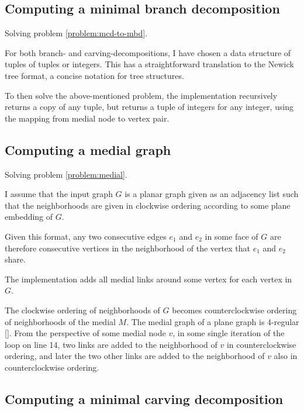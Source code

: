 \documentclass{article}
\begin{document}

	\subsection{Computing a minimal branch decomposition}\label{impl:mcd-to-mbd}
		
		Solving problem \ref{problem:mcd-to-mbd}.

		For both branch- and carving-decompositions, I have chosen a data structure of tuples of tuples or integers. This has a straightforward translation to the Newick tree format, a concise notation for tree structures.

		To then solve the above-mentioned problem, the implementation recursively returns a copy of any tuple, but returns a tuple of integers for any integer, using the mapping from medial node to vertex pair.

		
	\subsection{Computing a medial graph}\label{impl:medial}
		
		Solving problem \ref{problem:medial}.

		I assume that the input graph $G$ is a planar graph given as an adjacency list such that the neighborhoods are given in clockwise ordering according to some plane embedding of $G$.
		
		Given this format, any two consecutive edges $e_1$ and $e_2$ in some face of $G$ are therefore consecutive vertices in the neighborhood of the vertex that $e_1$ and $e_2$ share.

		The implementation adds all medial links around some vertex for each vertex in $G$. 
		
		The clockwise ordering of neighborhoods of $G$ becomes counterclockwise ordering of neighborhoods of the medial $M$. The medial graph of a plane graph is 4-regular \ref{}. From the perspective of some medial node $v$, in some single iteration of the loop on line 14, two links are added to the neighborhood of $v$ in counterclockwise ordering, and later the two other links are added to the neighborhood of $v$ also in counterclockwise ordering.
		
	
	\subsection{Computing a minimal carving decomposition}\label{impl:mcd}
\end{document}
